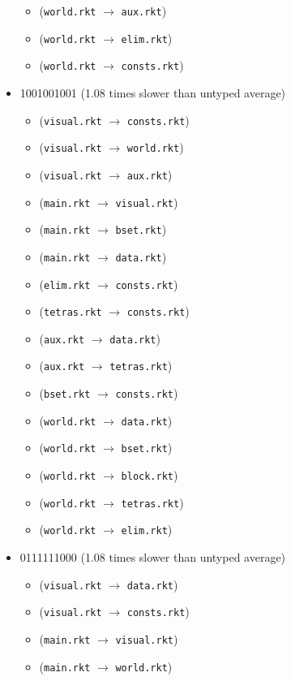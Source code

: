 \documentclass{article}
\newcommand{\mono}[1]{\texttt{#1}}
\begin{document}
\begin{itemize}
\begin{itemize}
  \item (\mono{world.rkt} $\rightarrow$ \mono{aux.rkt})
  \item (\mono{world.rkt} $\rightarrow$ \mono{elim.rkt})
  \item (\mono{world.rkt} $\rightarrow$ \mono{consts.rkt})
  \end{itemize}
\item 1001001001 (1.08 times slower than untyped average)
  \begin{itemize}
  \item (\mono{visual.rkt} $\rightarrow$ \mono{consts.rkt})
  \item (\mono{visual.rkt} $\rightarrow$ \mono{world.rkt})
  \item (\mono{visual.rkt} $\rightarrow$ \mono{aux.rkt})
  \item (\mono{main.rkt} $\rightarrow$ \mono{visual.rkt})
  \item (\mono{main.rkt} $\rightarrow$ \mono{bset.rkt})
  \item (\mono{main.rkt} $\rightarrow$ \mono{data.rkt})
  \item (\mono{elim.rkt} $\rightarrow$ \mono{consts.rkt})
  \item (\mono{tetras.rkt} $\rightarrow$ \mono{consts.rkt})
  \item (\mono{aux.rkt} $\rightarrow$ \mono{data.rkt})
  \item (\mono{aux.rkt} $\rightarrow$ \mono{tetras.rkt})
  \item (\mono{bset.rkt} $\rightarrow$ \mono{consts.rkt})
  \item (\mono{world.rkt} $\rightarrow$ \mono{data.rkt})
  \item (\mono{world.rkt} $\rightarrow$ \mono{bset.rkt})
  \item (\mono{world.rkt} $\rightarrow$ \mono{block.rkt})
  \item (\mono{world.rkt} $\rightarrow$ \mono{tetras.rkt})
  \item (\mono{world.rkt} $\rightarrow$ \mono{elim.rkt})
  \end{itemize}
\item 0111111000 (1.08 times slower than untyped average)
  \begin{itemize}
  \item (\mono{visual.rkt} $\rightarrow$ \mono{data.rkt})
  \item (\mono{visual.rkt} $\rightarrow$ \mono{consts.rkt})
  \item (\mono{main.rkt} $\rightarrow$ \mono{visual.rkt})
  \item (\mono{main.rkt} $\rightarrow$ \mono{world.rkt})

\end{itemize}
\end{itemize}
\end{document}
